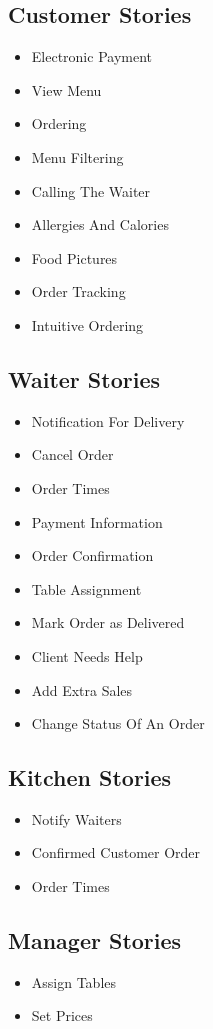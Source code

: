 \documentclass[12pt, twoside, a4paper]{report}
\begin{document}
\subsection*{Customer Stories}
\begin{itemize}
  \item Electronic Payment
  \item View Menu
  \item Ordering
  \item Menu Filtering
  \item Calling The Waiter
  \item Allergies And Calories
  \item Food Pictures
  \item Order Tracking
  \item Intuitive Ordering
\end{itemize}

\subsection*{Waiter Stories}
\begin{itemize}
  \item Notification For Delivery
  \item Cancel Order
  \item Order Times
  \item Payment Information
  \item Order Confirmation
  \item Table Assignment
  \item Mark Order as Delivered
  \item Client Needs Help
  \item Add Extra Sales
  \item Change Status Of An Order
\end{itemize}

\subsection*{Kitchen Stories}
\begin{itemize}
  \item Notify Waiters
  \item Confirmed Customer Order
  \item Order Times
\end{itemize}

\subsection*{Manager Stories}
\begin{itemize}
  \item Assign Tables
  \item Set Prices
\end{itemize}
\end{document}
